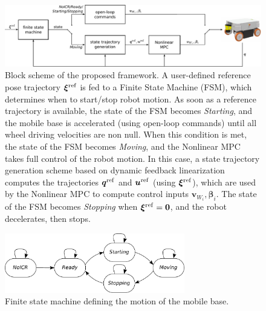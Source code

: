 \begin{figure}
    \centering
    \includegraphics[width=\textwidth]{figures/SWMR/blockscheme.pdf}
    \caption{Block scheme of the proposed framework. A user-defined reference
        pose trajectory $\bm{\xi}^{\rm ref}$ is fed to a Finite State Machine (FSM),
        which determines when to start/stop robot motion. As soon as a reference
        trajectory is available, the state of the FSM becomes \textit{Starting},
        and the mobile base is accelerated (using open-loop commands) until all
        wheel driving velocities are non null. When this condition is met, the
        state of the FSM becomes \textit{Moving}, and the Nonlinear MPC takes
        full control of the robot motion. In this case, a state trajectory
        generation scheme based on dynamic feedback linearization computes the
        trajectories $\bm{q}^{\rm ref}$ and $\bm{u}^{\rm ref}$
        (using $\bm{\xi}^{\rm ref}$), which are used by the Nonlinear MPC to
        compute control inputs $\bm{v}_{W_i}, \bm{\beta}_i$.
        The state of the FSM becomes \textit{Stopping} when
        $\bm{\xi}^{\rm ref} = \bm{0}$, and the robot decelerates, then stops.
    }
    \label{fig:block-scheme}
\end{figure}

\begin{figure}
    \centering
    \includegraphics[width=0.7\textwidth]{figures/SWMR/finitestatemachine.pdf}
    \caption{Finite state machine defining the motion of the mobile base.}
    \label{fig:finite-state-machine}
\end{figure}


